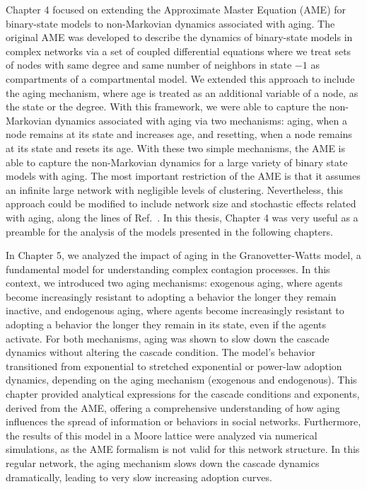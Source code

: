 Chapter 4 focused on extending the Approximate Master Equation (AME) for binary-state models to non-Markovian dynamics associated with aging. The original AME was developed to describe the dynamics of binary-state models in complex networks via a set of coupled differential equations where we treat sets of nodes with same degree and same number of neighbors in state $-1$ as compartments of a compartmental model. We extended this approach to include the aging mechanism, where age is treated as an additional variable of a node, as the state or the degree. With this framework, we were able to capture the non-Markovian dynamics associated with aging via two mechanisms: aging, when a node remains at its state and increases age, and resetting, when a node remains at its state and resets its age. With these two simple mechanisms, the AME is able to capture the non-Markovian dynamics for a large variety of binary state models with aging. The most important restriction of the AME is that it assumes an infinite large network with negligible levels of clustering. Nevertheless, this approach could be modified to include network size and stochastic effects related with aging, along the lines of Ref.~\cite{peralta-2020B}. In this thesis, Chapter 4 was very useful as a preamble for the analysis of the models presented in the following chapters.

In Chapter 5, we analyzed the impact of aging in the Granovetter-Watts model, a fundamental model for understanding complex contagion processes. In this context, we introduced two aging mechanisms: exogenous aging, where agents become increasingly resistant to adopting a behavior the longer they remain inactive, and endogenous aging, where agents become increasingly resistant to adopting a behavior the longer they remain in its state, even if the agents activate. For both mechanisms, aging was shown to slow down the cascade dynamics without altering the cascade condition. The model's behavior transitioned from exponential to stretched exponential or power-law adoption dynamics, depending on the aging mechanism (exogenous and endogenous). This chapter provided analytical expressions for the cascade conditions and exponents, derived from the AME, offering a comprehensive understanding of how aging influences the spread of information or behaviors in social networks. Furthermore, the results of this model in a Moore lattice were analyzed via numerical simulations, as the AME formalism is not valid for this network structure. In this regular network, the aging mechanism slows down the cascade dynamics dramatically, leading to very slow increasing adoption curves.

